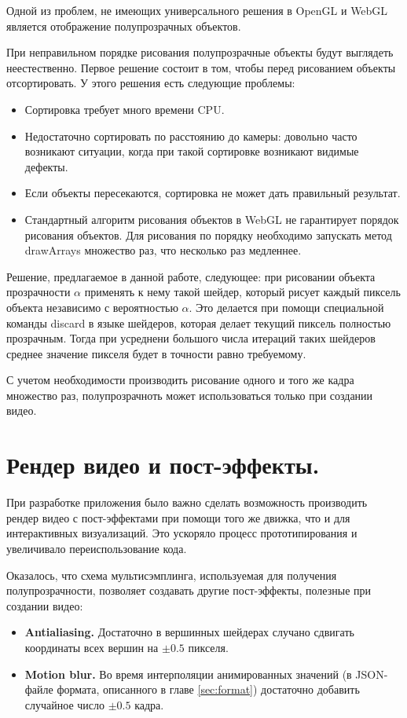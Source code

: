 Одной из проблем, не имеющих универсального решения в OpenGL и WebGL является отображение полупрозрачных объектов.

При неправильном порядке рисования полупрозрачные объекты будут выглядеть неестественно. Первое решение состоит в том, чтобы перед рисованием объекты отсортировать. У этого решения есть следующие проблемы:

\begin{itemize}
\item Сортировка требует много времени CPU.
\item Недостаточно сортировать по расстоянию до камеры: довольно часто возникают ситуации, когда при такой сортировке возникают видимые дефекты.
\item Если объекты пересекаются, сортировка не может дать правильный результат.
\item Стандартный алгоритм рисования объектов в WebGL не гарантирует порядок рисования объектов. Для рисования по порядку необходимо запускать метод drawArrays множество раз, что несколько раз медленнее.
\end{itemize}

Решение, предлагаемое в данной работе, следующее: при рисовании объекта прозрачности $\alpha$ применять к нему такой шейдер, который рисует каждый пиксель объекта независимо с вероятностью $\alpha$. Это делается при помощи специальной команды discard в языке шейдеров, которая делает текущий пиксель полностью прозрачным. Тогда при усреднени большого числа итераций таких шейдеров среднее значение пикселя будет в точности равно требуемому.

С учетом необходимости производить рисование одного и того же кадра множество раз, полупрозрачноть может использоваться только при создании видео.

\section{Рендер видео и пост-эффекты.}

При разработке приложения было важно сделать возможность производить рендер видео с пост-эффектами при помощи того же движка, что и для интерактивных визуализаций. Это ускоряло процесс прототипирования и увеличивало переиспользование кода.

Оказалось, что схема мультисэмплинга, используемая для получения полупрозрачности, позволяет создавать другие пост-эффекты, полезные при создании видео:

\begin{itemize}
\item {\bfseries Antialiasing.} Достаточно в вершинных шейдерах случано сдвигать координаты всех вершин на $\pm 0.5$ пикселя.
\item {\bfseries Motion blur.} Во время интерполяции анимированных значений (в JSON-файле формата, описанного в главе \ref{sec:format}) достаточно добавить случайное число $\pm 0.5$ кадра.
\end{itemize}


